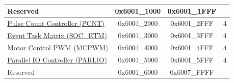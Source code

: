 \begin{ThreePartTable}
\begin{longtable}[c]{ |p{7cm}|c|c|r| }
    \rowcolor{gray!25}  Reserved                    & 0x6001\_1000 & 0x6001\_1FFF &        \\\hline
\hyperref[mod:pcnt]{Pulse Count Controller (PCNT)}& 0x6001\_2000 & 0x6001\_2FFF &   4        \\\hline
\hyperref[mod:evntaskmatrix]{Event Task Matrix (SOC\_ETM)} & 0x6001\_3000 & 0x6001\_3FFF &   4     \\\hline
\hyperref[mod:mcpwm]{Motor Control PWM (MCPWM)} & 0x6001\_4000 & 0x6001\_4FFF &   4     \\\hline
\hyperref[mod:parlio]{Parallel IO Controller (PARLIO)}                     & 0x6001\_5000 & 0x6001\_5FFF &   4        \\\hline
    \rowcolor{gray!25}  Reserved                    & 0x6001\_6000 & 0x6007\_FFFF &        \\\hline


\end{longtable}
\end{ThreePartTable}
